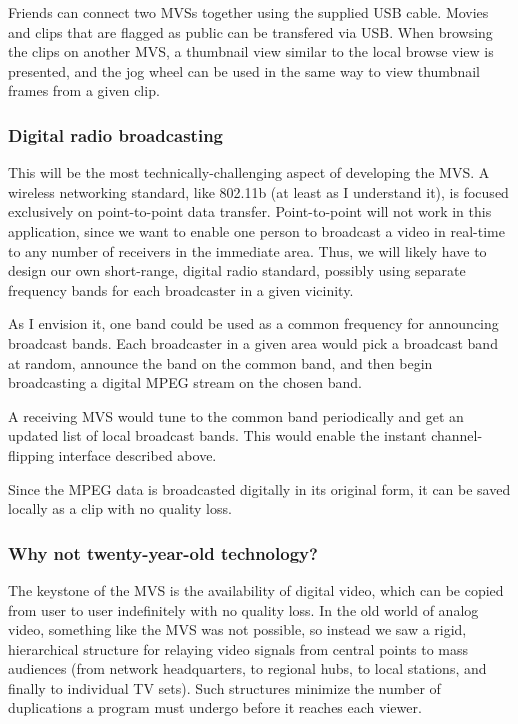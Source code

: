 \documentclass[12pt]{article}
\begin{document}
Friends can connect two MVSs together using the supplied USB cable.
Movies and clips that are flagged as public can be transfered via USB.
When browsing the clips on another MVS, a thumbnail view similar to the local browse view is presented, and the jog wheel can be used in the same way to view thumbnail frames from a given clip.

\subsubsection{Digital radio broadcasting}

This will be the most technically-challenging aspect of developing the MVS.
A wireless networking standard, like 802.11b (at least as I understand it), is focused exclusively on point-to-point data transfer.
Point-to-point will not work in this application, since we want to enable one person to broadcast a video in real-time to any number of receivers in the immediate area.
Thus, we will likely have to design our own short-range, digital radio standard, possibly using separate frequency bands for each broadcaster in a given vicinity.

As I envision it, one band could be used as a common frequency for announcing broadcast bands.
Each broadcaster in a given area would pick a broadcast band at random, announce the band on the common band, and then begin broadcasting a digital MPEG stream on the chosen band.

A receiving MVS would tune to the common band periodically and get an updated list of local broadcast bands.
This would enable the instant channel-flipping interface described above.

Since the MPEG data is broadcasted digitally in its original form, it can be saved locally as a clip with no quality loss.

\subsubsection{Why not twenty-year-old technology?}
The keystone of the MVS is the availability of digital video, which can be copied from user to user indefinitely with no quality loss.
In the old world of analog video, something like the MVS was not possible, so instead we saw a rigid, hierarchical structure for relaying video signals from central points to mass audiences (from network headquarters, to regional hubs, to local stations, and finally to individual TV sets).
Such structures minimize the number of duplications a program must undergo before it reaches each viewer.
\end{document}
